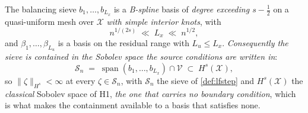 %
%

\begin{assumption}\label{ass:sieve}
The balancing sieve $b_1,\dots,b_{L_x}$ is a \emph{B-spline} basis of \emph{degree exceeding
$s-\tfrac12$} on a quasi-uniform mesh over $\mathcal X$ \emph{with simple interior knots}, with
\[
n^{1/(2s)}\;\ll\;L_x\;\ll\;n^{1/2},
\]
and $\beta_1,\dots,\beta_{L_u}$ is a basis on the residual range with $L_u\le L_x$. \emph{Consequently
the sieve is contained in the Sobolev space the source conditions are written in}:
\begin{equation}\label{eq:sieveinhs}
\mathcal S_n\;=\;\operatorname{span}(b_1,\dots,b_{L_x})\cap\mathcal V\;\subset\;H^{s}(\mathcal X),
\end{equation}
so $\|\zeta\|_{H^{s}}<\infty$ at every $\zeta\in\mathcal S_n$, with $\mathcal S_n$ the sieve of
\cref{def:lfstep} and $H^{s}(\mathcal X)$ the \emph{classical} Sobolev space of H1, 
\emph{the one that carries no boundary condition}, which is what makes the containment available to a
basis that satisfies none.
\end{assumption}

